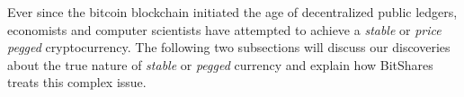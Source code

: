 Ever since the bitcoin blockchain initiated the age of decentralized public
ledgers, economists and computer scientists have attempted to achieve a
\emph{stable} or \emph{price pegged} cryptocurrency. The following two
subsections will discuss our discoveries about the true nature of \emph{stable}
or \emph{pegged} currency and explain how BitShares treats this complex
issue.
